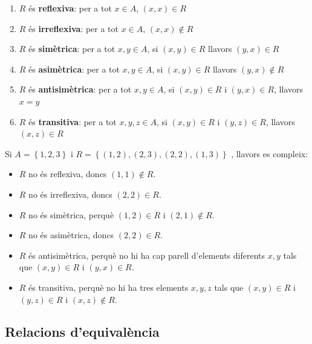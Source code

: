 \begin{enumerate}
\item $R$ és \textbf{reflexiva}: per a tot $x\in A$, $(x,x)\in R$

\item $R$ és \textbf{irreflexiva}: per a tot $x\in A$, $(x,x)\notin R$

\item $R$ és \textbf{simètrica}: per a tot $x,y\in A$, si $(x,y)\in R
$ llavors $(y,x)\in R$

\item $R$ és \textbf{asimètrica}: per a tot $x,y\in A$, si $(x,y)\in
R$ llavors $(y,x)\notin R$

\item $R$ és \textbf{antisimètrica}: per a tot $x,y\in A$, si $%
(x,y)\in R $ i $(y,x)\in R$, llavors $x=y$

\item $R$ és \textbf{transitiva}: per a tot $x,y,z\in A$, si $(x,y)\in R$
i $(y,z)\in R$, llavors $(x,z)\in R$
\end{enumerate}

\begin{exemple}
Si $A=\left\{ 1,2,3\right\} $ i $R=\left\{ (1,2),(2,3),(2,2),(1,3)\right\} $%
, llavors es compleix:

\begin{itemize}
\item $R$ no és reflexiva, doncs $(1,1)\notin R$.

\item $R$ no és irreflexiva, doncs $(2,2)\in R$.

\item $R$ no és simètrica, perquè $(1,2)\in R$ i $(2,1)\notin R$.

\item $R$ no és asimètrica, doncs $(2,2)\in R$.

\item $R$ és antisimètrica, perquè no hi ha cap parell
d'elements diferents $x,y$ tals que $(x,y)\in R$ i $(y,x)\in R$.

\item $R$ és transitiva, perquè no hi ha tres elements $x,y,z$ tals
que $(x,y)\in R$ i $(y,z)\in R$ i $(x,z)\notin R$.
\end{itemize}
\end{exemple}

\subsection{Relacions d'equivalència}

